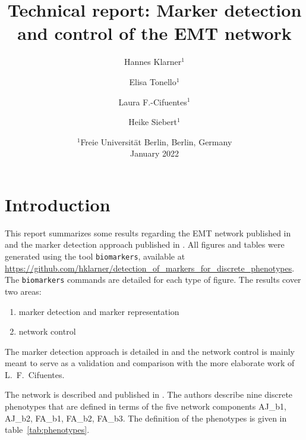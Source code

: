 \documentclass[11pt]{article}
\begin{document}
    \title{Technical report: Marker detection and control of the EMT network}
    \author{Hannes Klarner$^1$ \and Elisa Tonello$^1$ \and Laura F.-Cifuentes$^1$ \and Heike Siebert$^1$}
    \date{%
        $^1$Freie Universität Berlin, Berlin, Germany\\%
        January 2022
    }
    \maketitle

    \section{Introduction}\label{sec:introduction}
        This report summarizes some results regarding the EMT network published in \cite{selvaggio2020hybrid} and the marker detection approach published in \cite{klarner2021marker_detection}.
        All figures and tables were generated using the tool \texttt{biomarkers}, available at \url{https://github.com/hklarner/detection_of_markers_for_discrete_phenotypes}.
        The \texttt{biomarkers} commands are detailed for each type of figure.
        The results cover two areas:

        \begin{enumerate}
            \item marker detection and marker representation
            \item network control
        \end{enumerate}

        The marker detection approach is detailed in \cite{klarner2021marker_detection} and the network control is mainly meant to serve as a validation and comparison with the more elaborate work of L.~F.~Cifuentes.

        The network is described and published in \cite{selvaggio2020hybrid}.
        The authors describe nine discrete phenotypes that are defined in terms of the five network components AJ\_b1, AJ\_b2, FA\_b1, FA\_b2, FA\_b3.
        The definition of the phenotypes is given in table~\ref{tab:phenotypes}.
\end{document}
